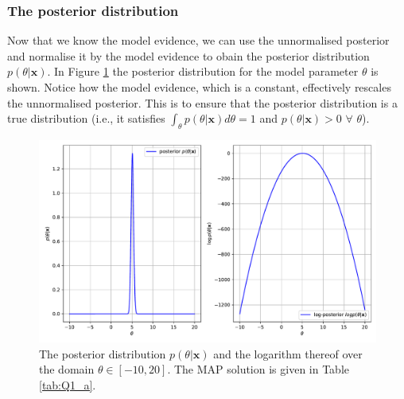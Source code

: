 \documentclass{article}
\begin{document}
\subsubsection{The posterior distribution}
Now that we know the model evidence, we can use the unnormalised posterior and normalise it by the model evidence to obain the posterior distribution $p(\theta \vert \mathbf{x})$. In Figure \ref{fig:Q1a_posterior} the posterior distribution for the model parameter $\theta$ is shown. Notice how the model evidence, which is a constant, effectively rescales the unnormalised posterior. This is to ensure that the posterior distribution is a true distribution (i.e., it satisfies $\int_\theta p(\theta \vert \mathbf{x})d\theta = 1$ and $p(\theta \vert \mathbf{x}) > 0$  $\forall$  $\theta$).
\begin{figure}[htb!]
\centering
\includegraphics[scale=0.6]{Q1a_5.pdf}
\caption{The posterior distribution $p(\theta \vert \mathbf{x})$ and the logarithm thereof over the domain $\theta \in [-10, 20]$. The MAP solution is given in Table \ref{tab:Q1_a}.}
\label{fig:Q1a_posterior}
\end{figure}
\end{document}

